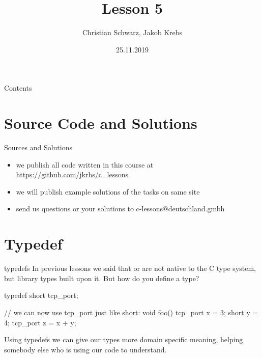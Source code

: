 \documentclass[10pt,graphics,aspectratio=169,table]{beamer}
\title{Lesson 5}
\author{Christian Schwarz, Jakob Krebs}
\date{25.11.2019}
\begin{document}
\maketitle

\begin{frame}{Contents}
    \tableofcontents
\end{frame}


\section{Source Code and Solutions}
\begin{frame}{Sources and Solutions}
    \begin{itemize}
        \item we publish all code written in this course at \url{https://github.com/jkrbs/c_lessons}
        \item we will publish example solutions of the tasks on same site
        \item send us questions or your solutions to c-lessons@deutschland.gmbh
    \end{itemize}
\end{frame}

\section{Typedef}
\begin{frame}[fragile]{typedefs}
    In previous lessons we said that  or  are not
    native to the C type system, but library types built upon it.
    But how do you define a type?
    
    \begin{codeblock}
typedef short tcp_port;

// we can now use tcp_port just like short:
void foo(){
    tcp_port x = 3;
    short y = 4;
    tcp_port z = x + y;
}
    \end{codeblock}

    Using typedefs we can give our types more domain specific meaning,
    helping somebody else who is using our code to understand. 
\end{frame}
\end{document}
